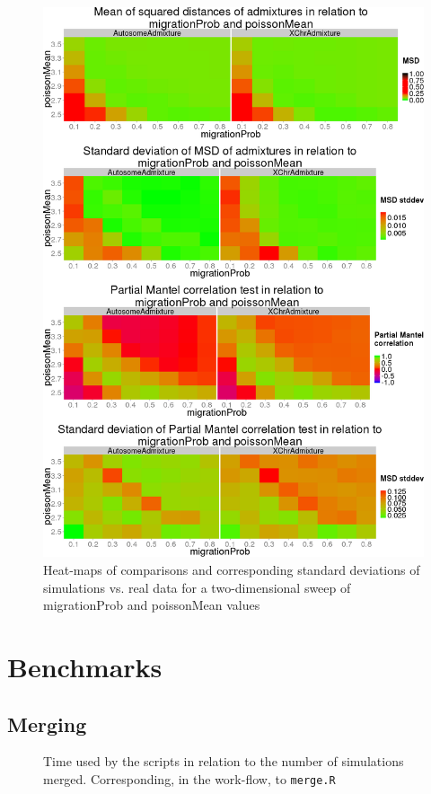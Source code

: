 \documentclass[a4paper,12pt]{report}
\begin{document}
\begin{figure}[ht]
	\centering
	\includegraphics[scale=0.31]{../data/sensit-comp-2d.png}
	\caption{Heat-maps of comparisons and corresponding standard deviations of simulations vs. real data for a two-dimensional sweep of migrationProb and poissonMean values}
	\label{app:sensit-comp-2d}
\end{figure}


\chapter{Benchmarks}
\label{app:bench}

\section{Merging}
\begin{figure}[ht]
	\centering
	\caption{Time used by the scripts in relation to the number of simulations merged. Corresponding, in the work-flow, to \texttt{merge.R}}
	\label{app:bench-merging-time}
\end{figure}
\end{document}
